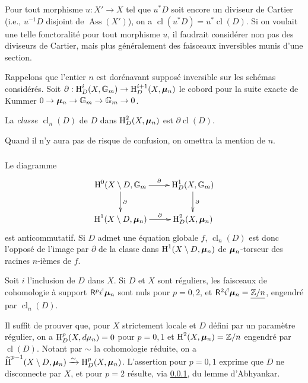 Pour tout morphisme $u:X'\to X$ tel que $u^* D$ soit encore un diviseur de 
Cartier (i.e., $u^{-1} D$ disjoint de $\operatorname{Ass}(X')$), on a 
$\operatorname{cl}(u^* D) = u^*\operatorname{cl}(D)$. Si on voulait une telle 
fonctoralit\'e pour tout morphisme $u$, il faudrait consid\'erer non pas des 
diviseurs de Cartier, mais plus g\'en\'eralement des faisceaux inversibles 
munis d'une section.

Rappelons que l'entier $n$ est dor\'enavant suppos\'e inversible sur les 
sch\'emas consid\'er\'es. Soit 
$\partial:\operatorname{H}_D^i(X,\mathbb{G}_m) \to \operatorname{H}_D^{i+1}(X,{\bm\mu}_n)$ le cobord pour la suite 
exacte de Kummer $0 \to {\bm\mu}_n \to \mathbb{G}_m \to \mathbb{G}_m \to 0$.





\begin{definition}\label{IV:2-1-2}
La \emph{classe $\operatorname{cl}_n(D)$} de $D$ dans $\operatorname{H}_D^2(X,{\bm\mu}_n)$ est 
$\partial \operatorname{cl}(D)$. 
\end{definition}

Quand il n'y aura pas de risque de confusion, on omettra la mention de $n$. 





\subsubsection{}\label{IV:2-1-3}

Le diagramme 
\[\xymatrix{
  \h^0(X\setminus D,\dG_m \ar[r]^-\partial \ar[d]^-\partial 
    & \h_D^1(X,\dG_m) \ar[d]^-\partial \\
  \h^1(X\setminus D,\dmu_n) \ar[r]^-\partial 
    & \h_D^2(X,\dmu_n)
}\]
est anticommutatif. Si $D$ admet une \'equation globale $f$, 
$\operatorname{cl}_n(D)$ est donc l'oppos\'e de l'image par $\partial$ de la 
classe dans $\operatorname{H}^1(X\setminus D,{\bm\mu}_n)$ de ${\bm\mu}_n$-torseur des racines 
$n$-i\`emes de $f$. 





\begin{proposition}\label{IV:2-1-4}
Soit $i$ l'inclusion de $D$ dans $X$. Si $D$ et $X$ sont r\'eguliers, les 
faisceaux de cohomologie \`a support $\mathsf{R}^p i^! {\bm\mu}_n$ sont nuls pour $p=0,2$, 
et $\mathsf{R}^2 i^!{\bm\mu}_n = \underline{\mathbb{Z}/n}$, engendr\'e par 
$\operatorname{cl}_n(D)$. 
\end{proposition}

Il suffit de prouver que, pour $X$ strictement locale et $D$ d\'efini par un 
param\`etre r\'egulier, on a $\operatorname{H}_D^p(X,d\mu_n) = 0$ pour $p=0,1$ et 
$\operatorname{H}^2(X,{\bm\mu}_n) = \mathbb{Z}/n$ engendr\'e par $\operatorname{cl}(D)$. Notant par 
$\sim$ la cohomologie r\'eduite, on a 
$\widetilde{\operatorname{H}}^{p-1}(X\setminus D,{\bm\mu}_n)\xrightarrow\sim \operatorname{H}_D^p(X,{\bm\mu}_n)$. L'assertion 
pour $p=0,1$ exprime que $D$ ne disconnecte par $X$, et pour $p=2$ r\'esulte, 
via \ref{IV:2-1-3}, du lemme d'Abhyankar. 

